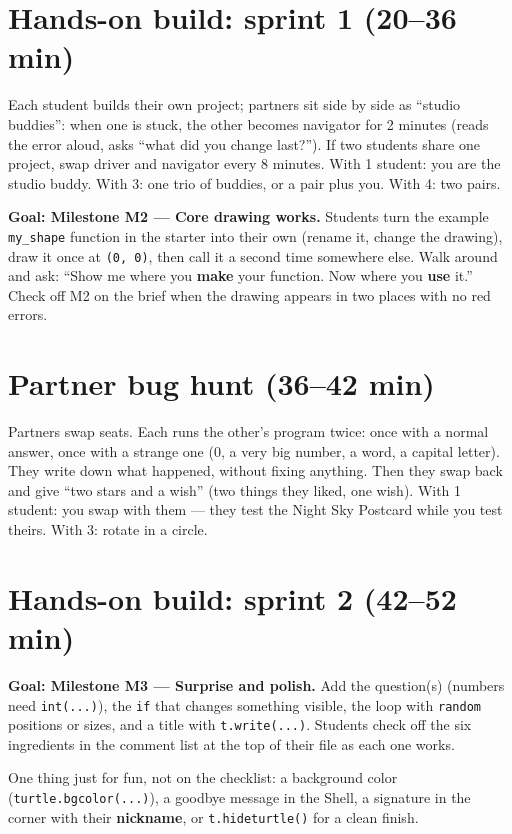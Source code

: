 \section{Hands-on build: sprint 1 (20--36 min)}
\begin{pairroles}
Each student builds their own project; partners sit side by side as \enquote{studio buddies}: when one is stuck, the other becomes navigator for 2 minutes (reads the error aloud, asks \enquote{what did you change last?}). If two students share one project, swap driver and navigator every 8 minutes.
With 1 student: you are the studio buddy. With 3: one trio of buddies, or a pair plus you. With 4: two pairs.
\end{pairroles}
\textbf{Goal: Milestone M2 --- Core drawing works.} Students turn the example \texttt{my\_shape} function in the starter into their own (rename it, change the drawing), draw it once at \texttt{(0, 0)}, then call it a second time somewhere else. Walk around and ask: \enquote{Show me where you \textbf{make} your function. Now where you \textbf{use} it.} Check off M2 on the brief when the drawing appears in two places with no red errors.

\section{Partner bug hunt (36--42 min)}
\begin{bughunt}
Partners swap seats. Each runs the other's program twice: once with a normal answer, once with a strange one (0, a very big number, a word, a capital letter). They write down what happened, without fixing anything. Then they swap back and give \enquote{two stars and a wish} (two things they liked, one wish). With 1 student: you swap with them --- they test the Night Sky Postcard while you test theirs. With 3: rotate in a circle.
\end{bughunt}

\section{Hands-on build: sprint 2 (42--52 min)}
\textbf{Goal: Milestone M3 --- Surprise and polish.} Add the question(s) (numbers need \texttt{int(...)}), the \texttt{if} that changes something visible, the loop with \texttt{random} positions or sizes, and a title with \texttt{t.write(...)}. Students check off the six ingredients in the comment list at the top of their file as each one works.
\begin{freebuild}
One thing just for fun, not on the checklist: a background color (\texttt{turtle.bgcolor(...)}), a goodbye message in the Shell, a signature in the corner with their \textbf{nickname}, or \texttt{t.hideturtle()} for a clean finish.
\end{freebuild}

